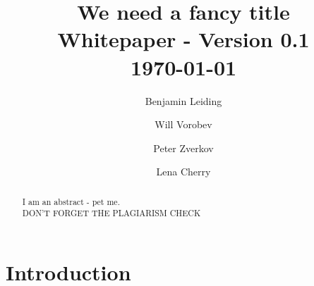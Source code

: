 \documentclass{llncs}
\begin{document}
	{
	\title{We need a fancy title\\ \small Whitepaper - Version 0.1\\\small \today}
	
	\author{Benjamin Leiding \and Will Vorobev \and Peter Zverkov \and Lena Cherry}
	
	
	
	\maketitle


	\begin{abstract}


		
		I am an abstract - pet me.\\
		
		DON'T FORGET THE PLAGIARISM CHECK
		
	\end{abstract}
	
	

	
	\section{Introduction}
		\label{s:introduction}

}
\end{document}
